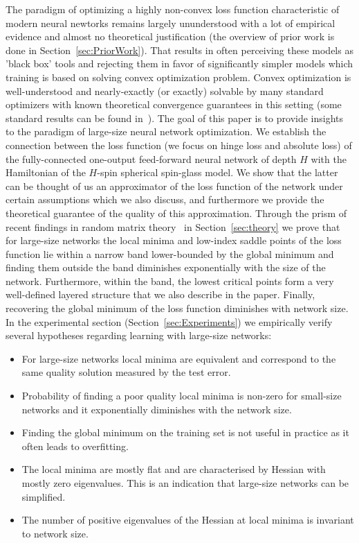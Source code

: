 \documentclass[twoside]{article}
\begin{document}
The paradigm of optimizing a highly non-convex loss function characteristic of modern neural newtorks remains largely ununderstood with a lot of empirical evidence and almost no theoretical justification (the overview of prior work is done in Section~\ref{sec:PriorWork}). That results in often perceiving these models as 'black box' tools and rejecting them in favor of significantly simpler models which training is based on solving convex optimization problem. Convex optimization is well-understood and nearly-exactly (or exactly) solvable by many standard optimizers with known theoretical convergence guarantees in this setting (some standard results can be found in~\cite{opac-b1104789, ben-tal_nemirovski:2001}). The goal of this paper is to provide insights to the paradigm of large-size neural network optimization. We establish the connection between the loss function (we focus on hinge loss and absolute loss) of the fully-connected one-output feed-forward neural network of depth $H$ with the Hamiltonian of the $H$-spin spherical spin-glass model. We show that the latter can be thought of us an approximator of the loss function of the network under certain assumptions which we also discuss, and furthermore we provide the theoretical guarantee of the quality of this approximation. Through the prism of recent findings in random matrix theory~\cite{AAC2010} in Section~\ref{sec:theory} we prove that for large-size networks the local minima and low-index saddle points of the loss function lie within a narrow band lower-bounded by the global minimum and finding them outside the band diminishes exponentially with the size of the network. Furthermore, within the band, the lowest critical points form a very well-defined layered structure that we also describe in the paper. Finally, recovering the global minimum of the loss function diminishes with network size. In the experimental section (Section~\ref{sec:Experiments}) we empirically verify several hypotheses regarding learning with large-size networks:
\vspace{-0.05in}
\begin{itemize}
\item For large-size networks local minima are equivalent and correspond to the same quality solution measured by the test error.
\vspace{-0.05in}
\item Probability of finding a poor quality local minima is non-zero for small-size networks and it exponentially diminishes with the network size.
\vspace{-0.05in}
\item Finding the global minimum on the training set is not useful in practice as it often leads to overfitting.
\vspace{-0.05in}
\item The local minima are mostly flat and are characterised by Hessian with mostly zero eigenvalues. This is an indication that large-size networks can be simplified.
\vspace{-0.05in}
\item The number of positive eigenvalues of the Hessian at local minima is invariant to network size.
\end{itemize}
\end{document}
